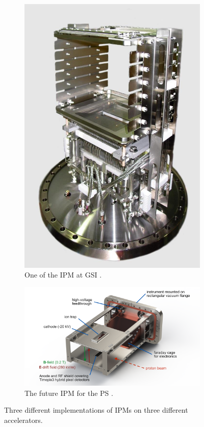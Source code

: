 \begin{figure}[!ht]
\begin{subfigure}[t]{0.45\textwidth}
    \includegraphics[width=\textwidth]{02_BeamDiag/figures/fig000_IPM_2}
    \caption[One of the IPM at GSI]{One of the IPM at GSI \cite{ForkJUAS}.}
    \label{}
  \end{subfigure}
  
  \begin{subfigure}[t]{1\textwidth}
    \includegraphics[width=\textwidth]{02_BeamDiag/figures/fig000_IPM_3}
    \caption[The future IPM for the PS]{The future IPM for the PS \cite{Storey2017}.}
    \label{}
  \end{subfigure}
  \caption[Three different implementations of IPMs on three different accelerators]{Three different implementations of IPMs on three different accelerators.}
  \label{chap2:fig:IPM_3}
\end{figure}

